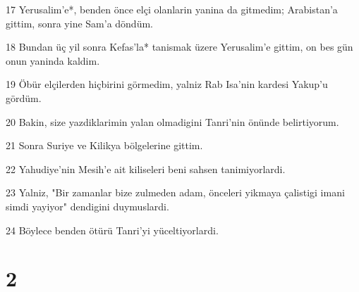 \par 17 Yerusalim'e*, benden önce elçi olanlarin yanina da gitmedim; Arabistan'a gittim, sonra yine Sam'a döndüm.
\par 18 Bundan üç yil sonra Kefas'la* tanismak üzere Yerusalim'e gittim, on bes gün onun yaninda kaldim.
\par 19 Öbür elçilerden hiçbirini görmedim, yalniz Rab Isa'nin kardesi Yakup'u gördüm.
\par 20 Bakin, size yazdiklarimin yalan olmadigini Tanri'nin önünde belirtiyorum.
\par 21 Sonra Suriye ve Kilikya bölgelerine gittim.
\par 22 Yahudiye'nin Mesih'e ait kiliseleri beni sahsen tanimiyorlardi.
\par 23 Yalniz, "Bir zamanlar bize zulmeden adam, önceleri yikmaya çalistigi imani simdi yayiyor" dendigini duymuslardi.
\par 24 Böylece benden ötürü Tanri'yi yüceltiyorlardi.

\chapter{2}

